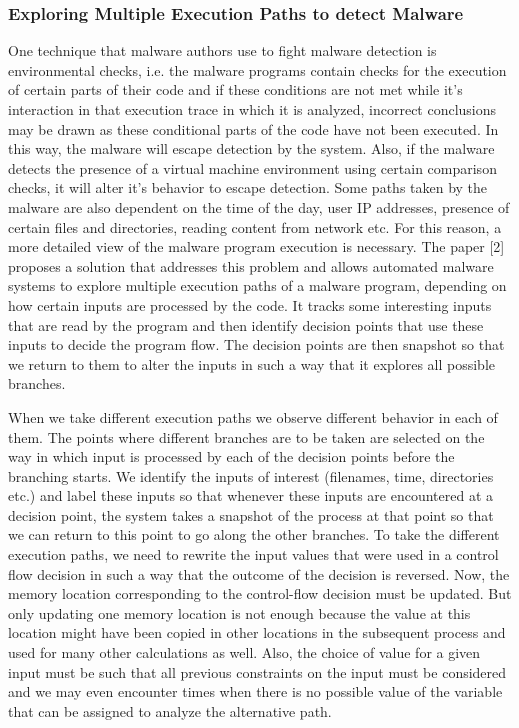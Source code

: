 \documentclass[11pt]{article}
\begin{document}
		\subsubsection{Exploring Multiple Execution Paths to detect Malware}
		One technique that malware authors use to fight malware detection is environmental checks, i.e. the malware programs contain checks for the execution of certain parts of their code and if these conditions are not met while it’s interaction in that execution trace in which it is analyzed, incorrect conclusions may be drawn as these conditional parts of the code have not been executed. In this way, the malware will escape detection by the system. Also, if the malware detects the presence of a virtual machine environment using certain comparison checks, it will alter it’s behavior to escape detection. Some paths taken by the malware are also dependent on the time of the day, user IP addresses, presence of certain files and directories, reading content from network etc. For this reason, a more detailed view of the malware program execution is necessary. The paper [2] proposes a solution that addresses this problem and allows automated malware systems to explore multiple execution paths of a malware program, depending on how certain inputs are processed by the code. It tracks some interesting inputs that are read by the program and then identify decision points that use these inputs to decide the program flow. The decision points are then snapshot so that we return to them to alter the inputs in such a way that it explores all possible branches.

		When we take different execution paths we observe different behavior in each of them. The points where different branches are to be taken are selected on the way in which input is processed by each of the decision points before the branching starts. We identify the inputs of interest (filenames, time, directories etc.) and label these inputs so that whenever these inputs are encountered at a decision point, the system takes a snapshot of the process at that point so that we can return to this point to go along the other branches. To take the different execution paths, we need to rewrite the input values that were used in a control flow decision in such a way that the outcome of the decision is reversed. Now, the memory location corresponding to the control-flow decision must be updated. But only updating one memory location is not enough because the value at this location might have been copied in other locations in the subsequent process and used for many other calculations as well. Also, the choice of value for a given input must be such that all previous constraints on the input must be considered and we may even encounter times when there is no possible value of the variable that can be assigned to analyze the alternative path.
\end{document}
